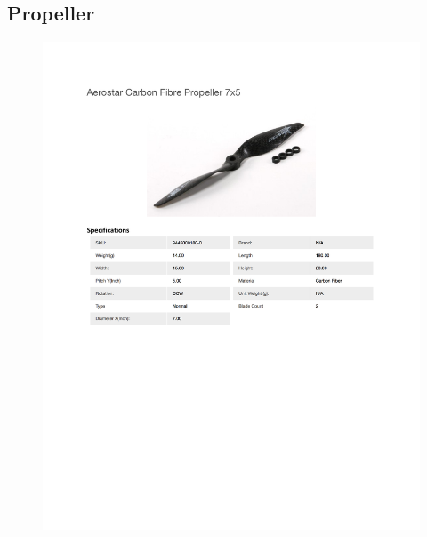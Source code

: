 \documentclass[../main.tex]{subfiles}
\begin{document}
\subsection{Propeller \cite{Propeller}} \label{propeller}
\begin{figure}[H]
	\centering
	\includegraphics[width=\textwidth]{img/specs/propeller.pdf}
\end{figure}

\end{document}
